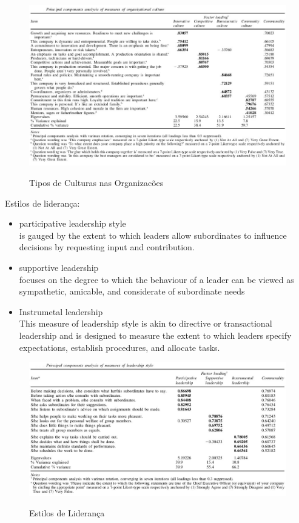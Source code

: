 \begin{figure}[H]
\centering
\includegraphics[scale=.60]{"./image/OB/Culturas.jpg"}\\
\caption{Tipos de Culturas nas Organizacões}
\label{grafico 1}
\end{figure}\par

Estilos de liderança:
\begin{itemize}
\item participative leadership style\\
is gauged by the extent to which leaders allow subordinates to influence decisions by requesting input and
contribution.
\item supportive leadership\\
focuses
on the degree to which the behaviour of a leader can be viewed as sympathetic, amicable, and considerate of subordinate needs
\item Instrumetal leadership\\
This measure of leadership style is akin to directive or transactional leadership and is designed to measure the extent to which leaders specify expectations, establish procedures, and allocate tasks.
\end{itemize}


\begin{figure}[H]
\centering
\includegraphics[scale=.5]{"./image/OB/Leadership.jpg"}\\
\caption{Estilos de Liderança}
\label{grafico 1}
\end{figure}\par



